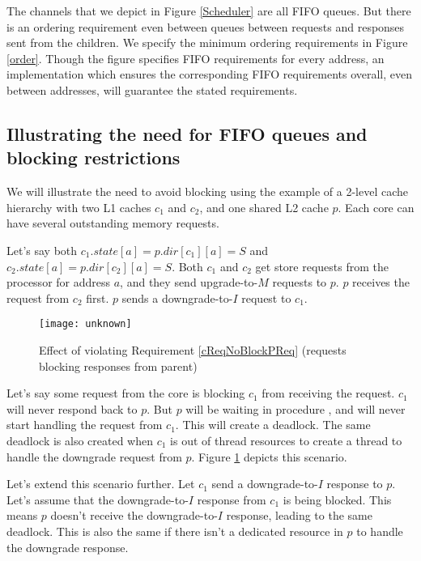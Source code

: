 The channels that we depict in Figure \ref{Scheduler} are all FIFO queues. But
there is an ordering requirement even between queues between requests and
responses sent from the children. We specify the minimum ordering requirements
in Figure \ref{order}. Though the figure specifies FIFO requirements for every
address, an implementation which ensures the corresponding FIFO requirements
overall, even between addresses, will guarantee the stated requirements.

\subsection{Illustrating the need for FIFO queues and blocking restrictions}
We will illustrate the need to avoid blocking using the example of a 2-level
cache hierarchy with two L1 caches $c_1$ and $c_2$, and one shared L2 cache
$p$. Each core can have several outstanding memory requests.

Let's say both $c_1.state[a] = p.dir[c_1][a] = S$ and $c_2.state[a] =
p.dir[c_2][a] = S$. Both $c_1$ and $c_2$ get store requests from the processor
for address $a$, and they send upgrade-to-$M$ requests to $p$.  $p$ receives the
request from $c_2$ first. $p$ sends a downgrade-to-$I$ request to $c_1$.

\begin{figure}
\centering
\texttt{[image: unknown]}
\caption{Effect of violating Requirement \ref{cReqNoBlockPReq} (requests blocking responses from parent)}
\label{unknown}
\end{figure}

Let's say some request from the core is blocking $c_1$ from receiving the
request. $c_1$ will never respond back to $p$. But $p$ will be waiting in
procedure \dReqL{}, and will never start handling the request from $c_1$. This
will create a deadlock.  The same deadlock is also created when $c_1$ is out of
thread resources to create a thread to handle the downgrade request from $p$.
Figure \ref{unknown} depicts this scenario.

Let's extend this scenario further. Let $c_1$ send a downgrade-to-$I$ response
to $p$. Let's assume that the downgrade-to-$I$ response from $c_1$ is being
blocked. This means $p$ doesn't receive the downgrade-to-$I$ response, leading
to the same deadlock. This is also the same if there isn't a dedicated resource
in $p$ to handle the downgrade response.

